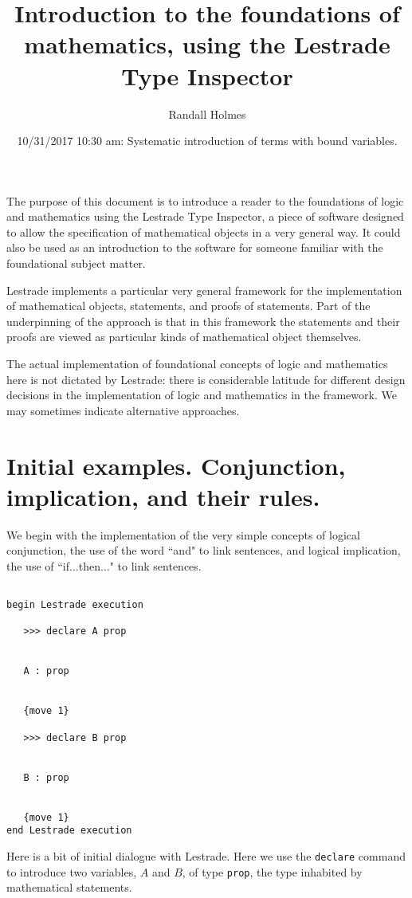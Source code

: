 \documentclass[12pt]{article}
\title{Introduction to the foundations of mathematics, using the Lestrade Type Inspector}
\author{Randall Holmes}
\date{10/31/2017 10:30 am:  Systematic introduction of terms with bound variables.}
\begin{document}
\maketitle

\tableofcontents

\newpage

The purpose of this document is to introduce a reader to the foundations of logic and mathematics using the Lestrade Type Inspector, a piece of software designed to allow the specification of mathematical objects in a very general way.  It could also be used as an introduction to the software for someone familiar with the foundational subject matter.

Lestrade implements a particular very general framework for the implementation of mathematical objects, statements, and proofs of statements.  Part of the underpinning of the approach is that in this framework the statements and their proofs are viewed as  particular kinds of mathematical object themselves.

The actual implementation of foundational concepts of logic and mathematics here is not dictated by Lestrade:  there is considerable latitude for different design decisions in the implementation of logic and mathematics in the framework.  We may sometimes indicate alternative approaches.

\section{Initial examples.  Conjunction, implication, and their rules.}

We begin with the implementation of the very simple concepts of logical conjunction, the use of the word ``and" to link sentences, and logical implication, the use of ``if$\ldots$then$\ldots$" to link sentences.

\begin{verbatim}

begin Lestrade execution

   >>> declare A prop


   A : prop


   {move 1}

   >>> declare B prop


   B : prop


   {move 1}
end Lestrade execution
\end{verbatim}

Here is a bit of initial dialogue with Lestrade.  Here we use the {\tt declare} command to introduce two variables, $A$ and $B$, of type {\tt prop},
the type inhabited by mathematical statements.
\end{document}
